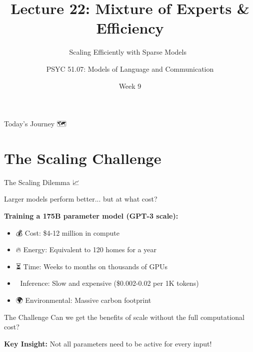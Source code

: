 \documentclass[aspectratio=169]{beamer}
\title{Lecture 22: Mixture of Experts \& Efficiency}
\subtitle{Scaling Efficiently with Sparse Models 🚀}
\author{PSYC 51.07: Models of Language and Communication}
\institute{Dr. Jeremy R. Manning}
\date{Week 9}
\begin{document}
\begin{frame}[shrink=10]
\titlepage
\end{frame}

\begin{frame}[shrink=5]{Today's Journey 🗺️}
\tableofcontents
\end{frame}

\section{The Scaling Challenge}

\begin{frame}{The Scaling Dilemma 📈}
\begin{discussionbox}
Larger models perform better... but at what cost?
\end{discussionbox}

\vspace{0.5em}

\textbf{Training a 175B parameter model (GPT-3 scale):}
\begin{itemize}\setlength{\itemsep}{0pt}
    \item 💰 Cost: \$4-12 million in compute
    \item 🔥 Energy: Equivalent to 120 homes for a year
    \item ⏳ Time: Weeks to months on thousands of GPUs
    \item 🐌 Inference: Slow and expensive (\$0.002-0.02 per 1K tokens)
    \item 🌍 Environmental: Massive carbon footprint
\end{itemize}

\vspace{0.5em}

\begin{alertblock}{The Challenge}
Can we get the benefits of scale without the full computational cost?
\end{alertblock}

\vspace{0.3em}

\textbf{Key Insight:} Not all parameters need to be active for every input!
\end{frame}
\end{document}
